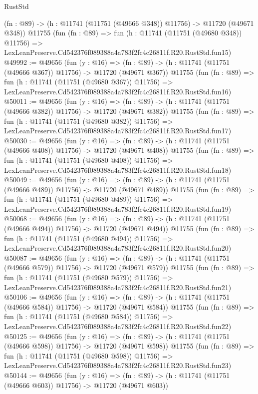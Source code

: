 \begin{lexlean}{RustStd}
\begin{coremodule}
    (fn : @89) -> (h : @11741 (@11751 (@49666 @348)) @11756) -> @11720 (@49671 @348))
    @11755
    (fun (fn : @89) =>
    fun (h : @11741 (@11751 (@49680 @348)) @11756) =>
    LexLeanPreserve.Cd542376f089388a4a783f2fc4c26811f.R20.RustStd.fun15)
@49992 := @49656
    (fun (y : @16) =>
    (fn : @89) -> (h : @11741 (@11751 (@49666 @367)) @11756) -> @11720 (@49671 @367))
    @11755
    (fun (fn : @89) =>
    fun (h : @11741 (@11751 (@49680 @367)) @11756) =>
    LexLeanPreserve.Cd542376f089388a4a783f2fc4c26811f.R20.RustStd.fun16)
@50011 := @49656
    (fun (y : @16) =>
    (fn : @89) -> (h : @11741 (@11751 (@49666 @382)) @11756) -> @11720 (@49671 @382))
    @11755
    (fun (fn : @89) =>
    fun (h : @11741 (@11751 (@49680 @382)) @11756) =>
    LexLeanPreserve.Cd542376f089388a4a783f2fc4c26811f.R20.RustStd.fun17)
@50030 := @49656
    (fun (y : @16) =>
    (fn : @89) -> (h : @11741 (@11751 (@49666 @408)) @11756) -> @11720 (@49671 @408))
    @11755
    (fun (fn : @89) =>
    fun (h : @11741 (@11751 (@49680 @408)) @11756) =>
    LexLeanPreserve.Cd542376f089388a4a783f2fc4c26811f.R20.RustStd.fun18)
@50049 := @49656
    (fun (y : @16) =>
    (fn : @89) -> (h : @11741 (@11751 (@49666 @489)) @11756) -> @11720 (@49671 @489))
    @11755
    (fun (fn : @89) =>
    fun (h : @11741 (@11751 (@49680 @489)) @11756) =>
    LexLeanPreserve.Cd542376f089388a4a783f2fc4c26811f.R20.RustStd.fun19)
@50068 := @49656
    (fun (y : @16) =>
    (fn : @89) -> (h : @11741 (@11751 (@49666 @494)) @11756) -> @11720 (@49671 @494))
    @11755
    (fun (fn : @89) =>
    fun (h : @11741 (@11751 (@49680 @494)) @11756) =>
    LexLeanPreserve.Cd542376f089388a4a783f2fc4c26811f.R20.RustStd.fun20)
@50087 := @49656
    (fun (y : @16) =>
    (fn : @89) -> (h : @11741 (@11751 (@49666 @579)) @11756) -> @11720 (@49671 @579))
    @11755
    (fun (fn : @89) =>
    fun (h : @11741 (@11751 (@49680 @579)) @11756) =>
    LexLeanPreserve.Cd542376f089388a4a783f2fc4c26811f.R20.RustStd.fun21)
@50106 := @49656
    (fun (y : @16) =>
    (fn : @89) -> (h : @11741 (@11751 (@49666 @584)) @11756) -> @11720 (@49671 @584))
    @11755
    (fun (fn : @89) =>
    fun (h : @11741 (@11751 (@49680 @584)) @11756) =>
    LexLeanPreserve.Cd542376f089388a4a783f2fc4c26811f.R20.RustStd.fun22)
@50125 := @49656
    (fun (y : @16) =>
    (fn : @89) -> (h : @11741 (@11751 (@49666 @598)) @11756) -> @11720 (@49671 @598))
    @11755
    (fun (fn : @89) =>
    fun (h : @11741 (@11751 (@49680 @598)) @11756) =>
    LexLeanPreserve.Cd542376f089388a4a783f2fc4c26811f.R20.RustStd.fun23)
@50144 := @49656
    (fun (y : @16) =>
    (fn : @89) -> (h : @11741 (@11751 (@49666 @603)) @11756) -> @11720 (@49671 @603))

\end{coremodule}
\end{lexlean}
